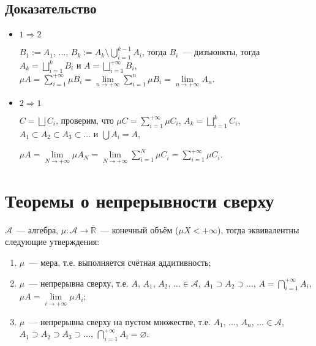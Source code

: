 \documentclass{article}
\begin{document}
        \subsection{Доказательство}
        
            \begin{itemize}
            
                \item $1 \Rightarrow 2$
                    
                    $B_1 := A_1$, $\ldots$, $B_k := A_k \setminus \bigcup\limits^{k - 1}_{i = 1} A_i$, тогда $B_i$~--- дизъюнкты, тогда $A_k = \bigsqcup\limits^k_{i = 1} B_i$ и $A = \bigsqcup\limits^{+\infty}_{i = 1} B_i$, $\mu A = \sum\limits^{+\infty}_{i = 1} \mu B_i = \lim\limits_{n \rightarrow +\infty} \sum\limits^n_{i = 1} \mu B_i = \lim\limits_{n \rightarrow +\infty} A_n$.
                    
                \item $2 \Rightarrow 1$
                
                    $C = \bigsqcup C_i$, проверим, что $\mu C = \sum\limits^{+\infty}_{i = 1} \mu C_i$, $A_k = \bigsqcup\limits^k_{i = 1} C_i$, $A_1 \subset A_2 \subset A_3 \subset \ldots$ и $\bigcup A_i = A$,
                    
                    $\mu A = \lim\limits_{N \rightarrow +\infty} \mu A_N = \lim\limits_{N \rightarrow +\infty} \sum\limits^N_{i = 1} \mu C_i = \sum\limits^{+\infty}_{i = 1} \mu C_i$.
                    
            \end{itemize}
            
    \newpage
    
    \section{Теоремы о непрерывности сверху}
    
        $\mathcal{A}$~--- алгебра, $\mu : \mathcal{A} \rightarrow \overline{\mathbb{R}}$~--- конечный объём ($\mu X < +\infty$), тогда эквивалентны следующие утверждения:
        
        \begin{enumerate}
        
            \item $\mu$~--- мера, т.е. выполняется счётная аддитивность;
            
            \item $\mu$~--- непрерывна сверху, т.е. $A$, $A_1$, $A_2$, $\ldots \in \mathcal{A}$, $A_1 \supset A_2 \supset \ldots$, $A = \bigcap\limits^{+\infty}_{i = 1} A_i$, $\mu A = \lim\limits_{i \rightarrow +\infty} \mu A_i$;
            
            \item $\mu$~--- непрерывна сверху на пустом множестве, т.е. $A_1$, $\ldots$, $A_n$, $\ldots \in \mathcal{A}$, $A_1 \supset A_2 \supset A_3 \supset \ldots$, $\bigcap\limits^{+\infty}_{i = 1} A_i = \varnothing$.
            
        \end{enumerate}
        
\end{document}
